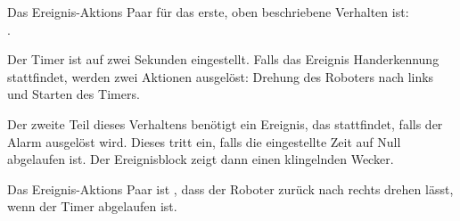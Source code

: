 \newpage
Das Ereignis-Aktions Paar für das erste, oben beschriebene Verhalten ist:
 \\ .

Der Timer ist auf zwei Sekunden eingestellt. Falls das Ereignis Handerkennung stattfindet, werden zwei Aktionen ausgelöst: Drehung des Roboters nach links und Starten des Timers.

Der zweite Teil dieses Verhaltens benötigt ein Ereignis, das stattfindet, falls der Alarm ausgelöst wird. Dieses tritt ein, falls die eingestellte Zeit auf Null abgelaufen ist. Der Ereignisblock  zeigt dann einen klingelnden Wecker.

Das Ereignis-Aktions Paar ist
,
dass der Roboter zurück nach rechts drehen lässt, wenn der Timer abgelaufen ist.




